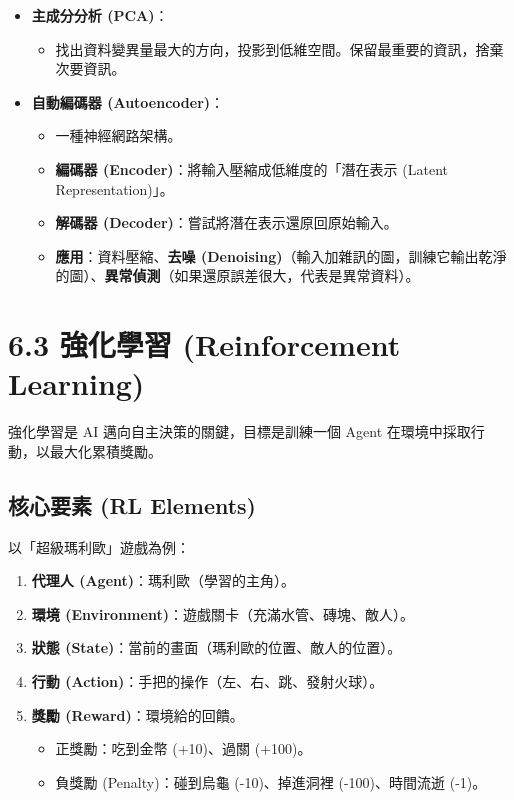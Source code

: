\documentclass[
  letterpaper,
  DIV=11,
  numbers=noendperiod]{scrreprt}
\providecommand{\tightlist}{%
  \setlength{\itemsep}{0pt}\setlength{\parskip}{0pt}}
\begin{document}
\begin{itemize}
\tightlist
\item
  \textbf{主成分分析 (PCA)}：

  \begin{itemize}
  \tightlist
  \item
    找出資料變異量最大的方向，投影到低維空間。保留最重要的資訊，捨棄次要資訊。
  \end{itemize}
\item
  \textbf{自動編碼器 (Autoencoder)}：

  \begin{itemize}
  \tightlist
  \item
    一種神經網路架構。
  \item
    \textbf{編碼器 (Encoder)}：將輸入壓縮成低維度的「潛在表示 (Latent
    Representation)」。
  \item
    \textbf{解碼器 (Decoder)}：嘗試將潛在表示還原回原始輸入。
  \item
    \textbf{應用}：資料壓縮、\textbf{去噪
    (Denoising)}（輸入加雜訊的圖，訓練它輸出乾淨的圖）、\textbf{異常偵測}（如果還原誤差很大，代表是異常資料）。
  \end{itemize}
\end{itemize}

\chapter{6.3 強化學習 (Reinforcement
Learning)}\label{sec-reinforcement-learning-detail}

強化學習是 AI 邁向自主決策的關鍵，目標是訓練一個 Agent
在環境中採取行動，以最大化累積獎勵。

\section{核心要素 (RL Elements)}\label{sec-rl-elements}

以「超級瑪利歐」遊戲為例：

\begin{enumerate}
\def\labelenumi{\arabic{enumi}.}
\tightlist
\item
  \textbf{代理人 (Agent)}：瑪利歐（學習的主角）。
\item
  \textbf{環境 (Environment)}：遊戲關卡（充滿水管、磚塊、敵人）。
\item
  \textbf{狀態 (State)}：當前的畫面（瑪利歐的位置、敵人的位置）。
\item
  \textbf{行動 (Action)}：手把的操作（左、右、跳、發射火球）。
\item
  \textbf{獎勵 (Reward)}：環境給的回饋。

  \begin{itemize}
  \tightlist
  \item
    正獎勵：吃到金幣 (+10)、過關 (+100)。
  \item
    負獎勵 (Penalty)：碰到烏龜 (-10)、掉進洞裡 (-100)、時間流逝 (-1)。
  \end{itemize}
\end{enumerate}
\end{document}

